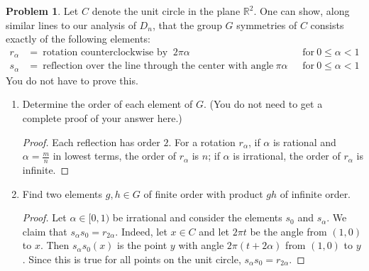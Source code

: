 \documentclass[11pt]{article}
\newcommand{\R}{\mathbb{R}}
\theoremstyle{definition}
\newtheorem{problem}{Problem}
\begin{document}
\begin{problem}
	Let $C$ denote the unit circle in the plane $\R^2$. One can show, along similar lines to our analysis of $D_n$, that the group $G$ symmetries of $C$ consists exactly of the following elements:
	\[\begin{aligned}  r_\alpha &= \ \text{rotation counterclockwise by } \ 2 \pi \alpha \quad &\text{for} \ 0\leq \alpha <1 \\
s_\alpha &= \ \text{reflection over the line through the center with angle} \ \pi \alpha \qquad &\text{for} \ 0\leq \alpha <1\end{aligned}\]
You do not have to prove this. 
\begin{enumerate}
\item Determine the order of each element of $G$. (You do not need to get a complete proof of your answer here.)
\begin{proof}
Each reflection has order $2$. For a rotation $r_\alpha$, if $\alpha$ is rational and $\alpha=\frac{m}{n}$ in lowest terms, the order of $r_\alpha$ is $n$; if $\alpha$ is irrational, the order of $r_\alpha$ is infinite.
\end{proof}
\item Find two elements $g,h\in G$ of finite order with product $gh$ of infinite order.
\begin{proof} Let $\alpha \in [0,1)$ be irrational and consider the elements $s_0$ and $s_\alpha$. We claim that $s_\alpha s_0= r_{2\alpha}$. Indeed, let $x\in C$ and let $2 \pi t$ be the angle from $(1,0)$ to $x$. Then $s_\alpha s_0 (x)$ is the point $y$ with angle $2 \pi (t+2 \alpha)$ from $(1,0)$ to $y$. Since this is true for all points on the unit circle, $s_\alpha s_0 = r_{2\alpha}$.
\end{proof}
\end{enumerate}
\end{problem}
\end{document}
